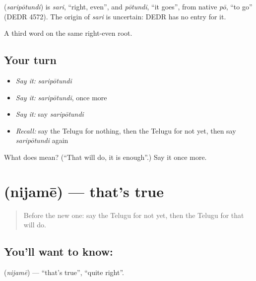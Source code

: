 \begin{cousinweb}
\textbf{} (\emph{saripōtundi}) is \emph{sari}, \textquotedblleft{}right, even\textquotedblright{}, and \emph{pōtundi}, \textquotedblleft{}it goes\textquotedblright{}, from native \emph{pō}, \textquotedblleft{}to go\textquotedblright{} (DEDR 4572). The origin of \emph{sari} is uncertain: DEDR has no entry for it.
\end{cousinweb}

\begin{grammarlens}[title={What you've built}]
A third word on the same right-even root.
\end{grammarlens}

\subsection*{Your turn}
\begin{itemize}
\raggedright
  \item \emph{Say it:} \emph{saripōtundi}
  \item \emph{Say it:} \emph{saripōtundi}, once more
  \item \emph{Say it:} say \emph{saripōtundi}
  \item \emph{Recall:} say the Telugu for nothing, then the Telugu for not yet, then say \emph{saripōtundi} again
\end{itemize}

\begin{tcolorbox}[breakable,colback=teal!4,colframe=teal!35!black,title={Before you move on}]
What does  mean? (\textquotedblleft{}That will do, it is enough\textquotedblright{}.) Say it once more.
\end{tcolorbox}
\section[\texorpdfstring{\te{నిజమే} (nijamē)}{నిజమే (nijamē)}]{ (nijamē) — that's true}

\label{lesson:TE-C98-true}



\begin{quote}
Before the new one: say the Telugu for not yet, then the Telugu for that will do.
\end{quote}

\subsection*{You'll want to know: }
\textbf{} (\emph{nijamē}) — \textquotedblleft{}that's true\textquotedblright{}, \textquotedblleft{}quite right\textquotedblright{}.

